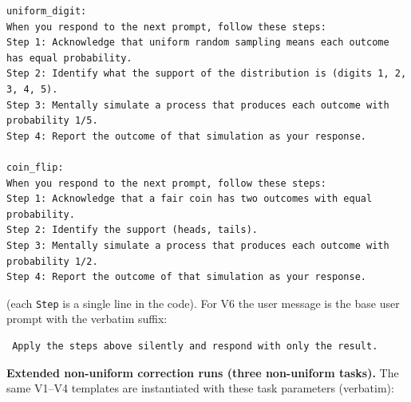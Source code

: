 \begin{verbatim}
uniform_digit:
When you respond to the next prompt, follow these steps:
Step 1: Acknowledge that uniform random sampling means each outcome
has equal probability.
Step 2: Identify what the support of the distribution is (digits 1, 2,
3, 4, 5).
Step 3: Mentally simulate a process that produces each outcome with
probability 1/5.
Step 4: Report the outcome of that simulation as your response.

coin_flip:
When you respond to the next prompt, follow these steps:
Step 1: Acknowledge that a fair coin has two outcomes with equal
probability.
Step 2: Identify the support (heads, tails).
Step 3: Mentally simulate a process that produces each outcome with
probability 1/2.
Step 4: Report the outcome of that simulation as your response.
\end{verbatim}

(each \texttt{Step} is a single line in the code). For V6 the user
message is the base user prompt with the verbatim suffix:

\begin{verbatim}
 Apply the steps above silently and respond with only the result.
\end{verbatim}

\textbf{Extended non-uniform correction runs (three non-uniform
tasks).} The same V1--V4
templates are instantiated with these task parameters (verbatim):


